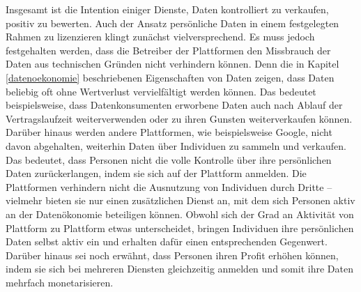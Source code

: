 \noindent Insgesamt ist die Intention einiger Dienste, Daten kontrolliert zu verkaufen, positiv zu bewerten. Auch der Ansatz persönliche Daten in einem festgelegten Rahmen zu lizenzieren klingt zunächst vielversprechend. Es muss jedoch festgehalten werden, dass die Betreiber der Plattformen den Missbrauch der Daten aus technischen Gründen nicht verhindern können. Denn die in Kapitel \ref{datenoekonomie} beschriebenen Eigenschaften von Daten zeigen, dass Daten beliebig oft ohne Wertverlust vervielfältigt werden können. Das bedeutet beispielsweise, dass Datenkonsumenten erworbene Daten auch nach Ablauf der Vertragslaufzeit weiterverwenden oder zu ihren Gunsten weiterverkaufen können. Darüber hinaus werden andere Plattformen, wie beispielsweise Google, nicht davon abgehalten, weiterhin Daten über Individuen zu sammeln und verkaufen. Das bedeutet, dass Personen nicht die volle Kontrolle über ihre persönlichen Daten zurückerlangen, indem sie sich auf der Plattform anmelden. Die Plattformen verhindern nicht die Ausnutzung von Individuen durch Dritte -- vielmehr bieten sie nur einen zusätzlichen Dienst an, mit dem sich Personen aktiv an der Datenökonomie beteiligen können. Obwohl sich der Grad an Aktivität von Plattform zu Plattform etwas unterscheidet, bringen Individuen ihre persönlichen Daten selbst aktiv ein und erhalten dafür einen entsprechenden Gegenwert. Darüber hinaus sei noch erwähnt, dass Personen ihren Profit erhöhen können, indem sie sich bei mehreren Diensten gleichzeitig anmelden und somit ihre Daten mehrfach monetarisieren.
